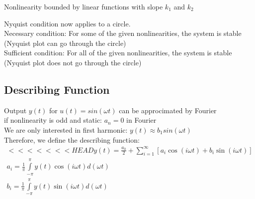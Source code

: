 \begin{minipage}{0.39\linewidth}
    Nonlinearity bounded by linear functions with slope $k_1$ and $k_2$
\end{minipage}

Nyquist condition now applies to a circle.\\
Necessary condition: For some of the given nonlinearities, the system is stable (Nyquist plot can go through the circle)\\
Sufficient condition: For all of the given nonlinearities, the system is stable (Nyquist plot does not go through the circle)

\subsection{Describing Function}
    Output $y(t)$ for $u(t) = sin(\omega t)$ can be approcimated by Fourier\\
    if nonlinearity is odd and static: $a_n = 0$ in Fourier\\
    We are only interested in first harmonic: $y(t) \approx b_1 sin(\omega t)$\\
    Therefore, we define the describing function:
    \begin{align*}
<<<<<<< HEAD
        y(t) = \frac{a_0}{2} + \sum\limits_{i = 1}^{\infty}[a_i \cos(i \omega t) + b_i \sin(i \omega t)]\\
        a_i = \frac{1}{\pi} \int\limits_{-\pi}^{\pi} y(t) \cos(i \omega t) d(\omega t)\\
        b_i = \frac{1}{\pi} \int\limits_{-\pi}^{\pi} y(t) \sin(i \omega t) d(\omega t)
    \end{align*}
